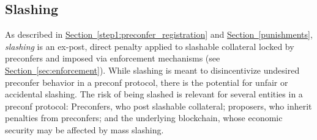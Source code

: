 \documentclass[a4paper]{article}
\theoremstyle{boldstyle}
\begin{document}
    
\subsection{Slashing}
    As described in \hyperref[step1:preconfer_registration]{Section~\ref{step1:preconfer_registration}} and \hyperref[punishments]{Section~\ref{punishments}}, \emph{slashing} is an ex-post, direct penalty applied to slashable collateral locked by preconfers and imposed via enforcement mechanisms (see \hyperref[sec:enforcement]{Section~\ref{sec:enforcement}}). 
    While slashing is meant to disincentivize undesired preconfer behavior in a preconf protocol, there is the potential for unfair or accidental slashing.
    The risk of being slashed is relevant for several entities in a preconf protocol: Preconfers, who post slashable collateral; proposers, who inherit penalties from preconfers; and the underlying blockchain, whose economic security may be affected by mass slashing. 
\end{document}
